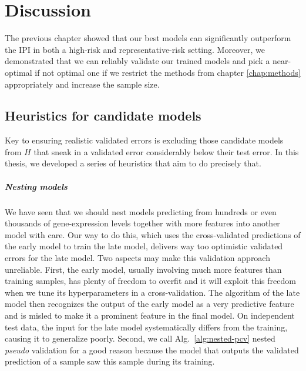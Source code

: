 \chapter{Discussion} \label{chap:discussion}

The previous chapter showed that our best models can significantly outperform the IPI in both 
a high-risk and representative-risk setting. Moreover, we demonstrated that we can reliably validate 
our trained models and pick a near-optimal if not optimal one if we restrict the methods from 
chapter \ref{chap:methods} appropriately and increase the sample size.

\section{Heuristics for candidate models}

Key to ensuring realistic validated errors is excluding those candidate models from $H$ that sneak 
in a validated error considerably below their test error. In this thesis, we developed a series 
of heuristics that aim to do precisely that.

\paragraph{Nesting models}
We have seen that we should nest models predicting from hundreds or even thousands of 
gene-expression levels together with more features into another model with care. Our way to do 
this, which uses the cross-validated predictions of the early model to train the late model, 
delivers way too optimistic validated errors for the late model. Two aspects may make this 
validation approach unreliable.
First, the early model, usually involving 
much more features than training samples, has plenty of freedom to overfit and it will exploit this 
freedom when we tune its hyperparameters in a cross-validation. The algorithm of the late model then 
recognizes the output of the early model as a very predictive feature and is misled to make it 
a prominent feature in the final model. On independent test data, the input for the late model 
systematically differs from the training, causing it to generalize poorly. Second, we call Alg.\ 
\ref{alg:nested-pcv} nested \textit{pseudo} validation for a good reason because the model that 
outputs the validated prediction of a sample saw this sample during its training. 


